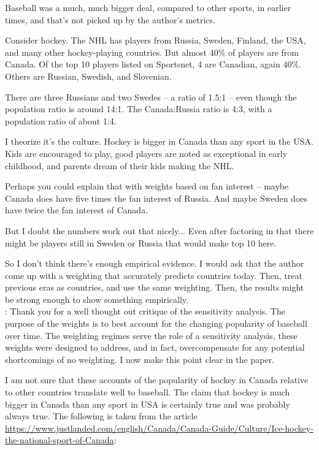 \documentclass[11pt]{article}
\begin{document}
Baseball was a much, much bigger deal, compared to other sports, in earlier 
times, and that's not picked up by the author's metrics. 

Consider hockey.  The NHL has players from Russia, Sweden, Finland, the USA, 
and many other hockey-playing countries.  But almost 40\% of players are from 
Canada.  Of the top 10 players listed on Sportsnet, 4 are Canadian, again 40\%.  
Others are Russian, Swedish, and Slovenian. 

There are three Russians and two Swedes -- a ratio of 1.5:1 -- even though the 
population ratio is around 14:1.  The Canada:Russia ratio is 4:3, with a 
population ratio of about 1:4.

I theorize it's the culture.  Hockey is bigger in Canada than any sport in the 
USA.  Kids are encouraged to play, good players are noted as exceptional in 
early childhood, and parents dream of their kids making the NHL.

Perhaps you could explain that with weights based on fan interest -- maybe 
Canada does have five times the fan interest of Russia.  And maybe Sweden 
does have twice the fan interest of Canada. 

But I doubt the numbers work out that nicely... Even after factoring in that 
there might be players still in Sweden or Russia that would make top 10 here.  

So I don't think there's enough empirical evidence.  I would ask that the 
author come up with a weighting that accurately predicts countries today.  
Then, treat previous eras as countries, and use the same weighting.  Then, 
the results might be strong enough to show something empirically. \\



:  
Thank you for a well thought out critique of the sensitivity analysis.
The purpose of the weights is to best account for the changing popularity of 
baseball over time.  
The weighting regimes serve the role of a sensitivity analysis, these weights 
were designed to address, and in fact, overcompensate for any potential 
shortcomings of no weighting.
I now make this point clear in the paper.

I am not sure that these accounts of the popularity of hockey in Canada 
relative to other countries translate well to baseball.  The claim that 
hockey is much bigger in Canada than any sport in USA is certainly true and 
was probably always true.  
The following is taken from the article 
\url{https://www.justlanded.com/english/Canada/Canada-Guide/Culture/Ice-hockey-the-national-sport-of-Canada}: \\
\end{document}

